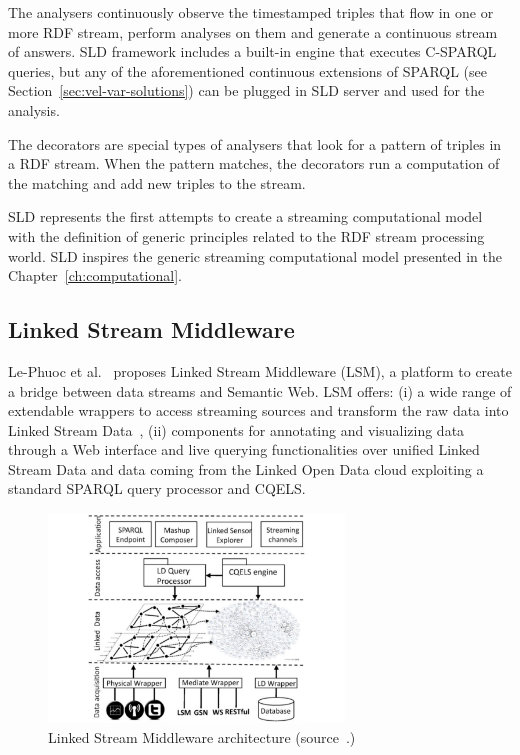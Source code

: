 The \textsf{analysers} continuously observe the timestamped triples that flow in one or more RDF stream, perform analyses on them and generate a continuous stream of answers. SLD framework includes a built-in engine that executes C-SPARQL queries, but any of the aforementioned continuous extensions of SPARQL (see Section~\ref{sec:vel-var-solutions}) can be plugged in SLD server and used for the analysis. 

The \textsf{decorators} are special types of analysers that look for a pattern of triples in a RDF stream. When the pattern matches, the decorators run a computation of the matching and add new triples to the stream.

SLD represents the first attempts to create a streaming computational model with the definition of generic principles related to the RDF stream processing world. SLD inspires the generic streaming computational model presented in the Chapter~\ref{ch:computational}.

\subsection{Linked Stream Middleware}
Le-Phuoc et al.~\cite{DBLP:journals/ws/PhuocNPH12} proposes Linked Stream Middleware (LSM), a platform to create a bridge between data streams and Semantic Web.
LSM offers: (i) a wide range of extendable wrappers to access streaming sources and transform the raw data into Linked Stream Data~\cite{DBLP:conf/semweb/SequedaC09}, (ii) components for annotating and visualizing data through a Web interface and live querying functionalities over unified Linked Stream Data and data coming from the Linked Open Data cloud exploiting a standard SPARQL query processor and CQELS.

\begin{figure}[t]
\begin{center}
\includegraphics[width=0.7\textwidth]{img/lsm}
\caption{Linked Stream Middleware architecture (source~\cite{DBLP:journals/ws/PhuocNPH12}.)}
\label{fig:lsm-arch}
\end{center}
\end{figure}

